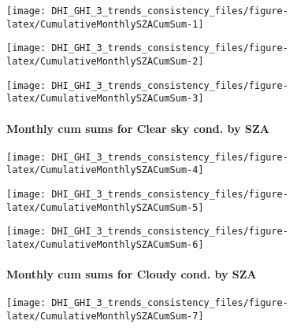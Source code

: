 \documentclass[
  10pt,
  a4paper,oneside]{article}
\begin{document}
\begin{center}\texttt{[image: DHI\_GHI\_3\_trends\_consistency\_files/figure-latex/CumulativeMonthlySZACumSum-1]} \end{center}

\begin{center}\texttt{[image: DHI\_GHI\_3\_trends\_consistency\_files/figure-latex/CumulativeMonthlySZACumSum-2]} \end{center}

\begin{center}\texttt{[image: DHI\_GHI\_3\_trends\_consistency\_files/figure-latex/CumulativeMonthlySZACumSum-3]} \end{center}

\newpage

\FloatBarrier

\hypertarget{monthly-cum-sums-for-clear-sky-cond.-by-sza}{%
\paragraph{Monthly cum sums for Clear sky cond. by SZA}\label{monthly-cum-sums-for-clear-sky-cond.-by-sza}}

\begin{center}\texttt{[image: DHI\_GHI\_3\_trends\_consistency\_files/figure-latex/CumulativeMonthlySZACumSum-4]} \end{center}

\begin{center}\texttt{[image: DHI\_GHI\_3\_trends\_consistency\_files/figure-latex/CumulativeMonthlySZACumSum-5]} \end{center}

\begin{center}\texttt{[image: DHI\_GHI\_3\_trends\_consistency\_files/figure-latex/CumulativeMonthlySZACumSum-6]} \end{center}

\newpage

\FloatBarrier

\hypertarget{monthly-cum-sums-for-cloudy-cond.-by-sza}{%
\paragraph{Monthly cum sums for Cloudy cond. by SZA}\label{monthly-cum-sums-for-cloudy-cond.-by-sza}}

\begin{center}\texttt{[image: DHI\_GHI\_3\_trends\_consistency\_files/figure-latex/CumulativeMonthlySZACumSum-7]} \end{center}
\end{document}
